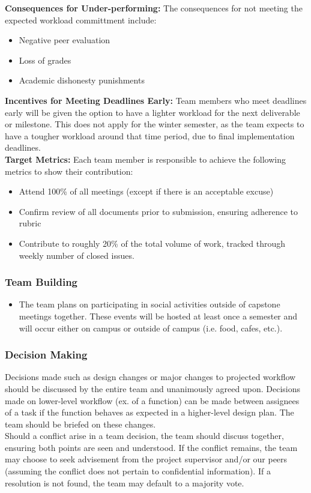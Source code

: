 \documentclass{article}
\begin{document}
\noindent\textbf{Consequences for Under-performing:}
The consequences for not meeting the expected workload committment include: 
\begin{itemize}
  \item Negative peer evaluation
  \item Loss of grades
  \item Academic dishonesty punishments
\end{itemize}


\noindent\textbf{Incentives for Meeting Deadlines Early:} Team members who meet deadlines early will be given the option
to have a lighter workload for the next deliverable or milestone. This does not apply for the winter semester,
as the team expects to have a tougher workload around that time period, due to final implementation deadlines. \\

\noindent\textbf{Target Metrics:}
Each team member is responsible to achieve the following metrics to show their contribution:
\begin{itemize}
  \item Attend 100\% of all meetings (except if there is an acceptable excuse)
  \item Confirm review of all documents prior to submission, ensuring adherence to rubric
  \item Contribute to roughly 20\% of the total volume of work, tracked through weekly number of closed issues.
\end{itemize}


\subsubsection*{Team Building}

\begin{itemize}
  \item The team plans on participating in social activities outside of capstone meetings together. These events will be hosted at least once a semester and will occur either on campus or outside of campus (i.e. food, cafes, etc.).  
\end{itemize}  


\subsubsection*{Decision Making} 

Decisions made such as design changes or major changes to projected workflow should be discussed by the entire team and unanimously agreed upon. Decisions made on lower-level workflow (ex. of a function) can be made between assignees of a task if the function behaves as expected in a higher-level design plan. The team should be briefed on these changes.  \\

Should a conflict arise in a team decision, the team should discuss together, ensuring both points are seen and understood. If the conflict remains, the team may choose to seek advisement from the project supervisor and/or our peers (assuming the conflict does not pertain to confidential information). If a resolution is not found, the team may default to a majority vote.   
\end{document}
